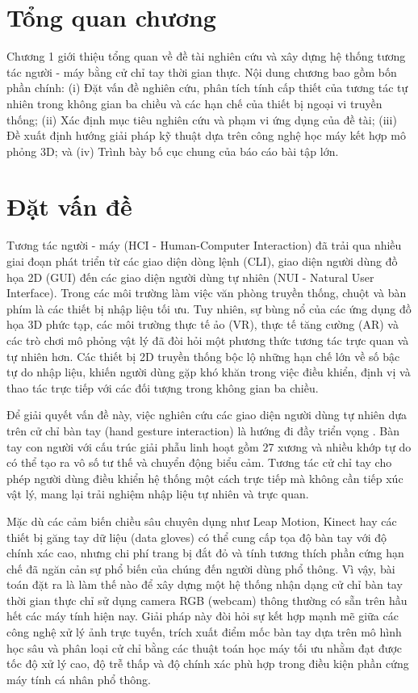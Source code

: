 \documentclass[../BTL.tex]{subfiles}
\begin{document}
\section*{Tổng quan chương}
Chương 1 giới thiệu tổng quan về đề tài nghiên cứu và xây dựng hệ thống tương tác người - máy bằng cử chỉ tay thời gian thực. Nội dung chương bao gồm bốn phần chính: (i) Đặt vấn đề nghiên cứu, phân tích tính cấp thiết của tương tác tự nhiên trong không gian ba chiều và các hạn chế của thiết bị ngoại vi truyền thống; (ii) Xác định mục tiêu nghiên cứu và phạm vi ứng dụng của đề tài; (iii) Đề xuất định hướng giải pháp kỹ thuật dựa trên công nghệ học máy kết hợp mô phỏng 3D; và (iv) Trình bày bố cục chung của báo cáo bài tập lớn.

\section{Đặt vấn đề}
\label{section:1.1}
Tương tác người - máy (HCI - Human-Computer Interaction) đã trải qua nhiều giai đoạn phát triển từ các giao diện dòng lệnh (CLI), giao diện người dùng đồ họa 2D (GUI) đến các giao diện người dùng tự nhiên (NUI - Natural User Interface). Trong các môi trường làm việc văn phòng truyền thống, chuột và bàn phím là các thiết bị nhập liệu tối ưu. Tuy nhiên, sự bùng nổ của các ứng dụng đồ họa 3D phức tạp, các môi trường thực tế ảo (VR), thực tế tăng cường (AR) và các trò chơi mô phỏng vật lý đã đòi hỏi một phương thức tương tác trực quan và tự nhiên hơn. Các thiết bị 2D truyền thống bộc lộ những hạn chế lớn về số bậc tự do nhập liệu, khiến người dùng gặp khó khăn trong việc điều khiển, định vị và thao tác trực tiếp với các đối tượng trong không gian ba chiều.

Để giải quyết vấn đề này, việc nghiên cứu các giao diện người dùng tự nhiên dựa trên cử chỉ bàn tay (hand gesture interaction) là hướng đi đầy triển vọng \cite{ravikiran2013hand}. Bàn tay con người với cấu trúc giải phẫu linh hoạt gồm 27 xương và nhiều khớp tự do có thể tạo ra vô số tư thế và chuyển động biểu cảm. Tương tác cử chỉ tay cho phép người dùng điều khiển hệ thống một cách trực tiếp mà không cần tiếp xúc vật lý, mang lại trải nghiệm nhập liệu tự nhiên và trực quan.

Mặc dù các cảm biến chiều sâu chuyên dụng như Leap Motion, Kinect hay các thiết bị găng tay dữ liệu (data gloves) có thể cung cấp tọa độ bàn tay với độ chính xác cao, nhưng chi phí trang bị đắt đỏ và tính tương thích phần cứng hạn chế đã ngăn cản sự phổ biến của chúng đến người dùng phổ thông. Vì vậy, bài toán đặt ra là làm thế nào để xây dựng một hệ thống nhận dạng cử chỉ bàn tay thời gian thực chỉ sử dụng camera RGB (webcam) thông thường có sẵn trên hầu hết các máy tính hiện nay. Giải pháp này đòi hỏi sự kết hợp mạnh mẽ giữa các công nghệ xử lý ảnh trực tuyến, trích xuất điểm mốc bàn tay dựa trên mô hình học sâu và phân loại cử chỉ bằng các thuật toán học máy tối ưu nhằm đạt được tốc độ xử lý cao, độ trễ thấp và độ chính xác phù hợp trong điều kiện phần cứng máy tính cá nhân phổ thông.
\end{document}
